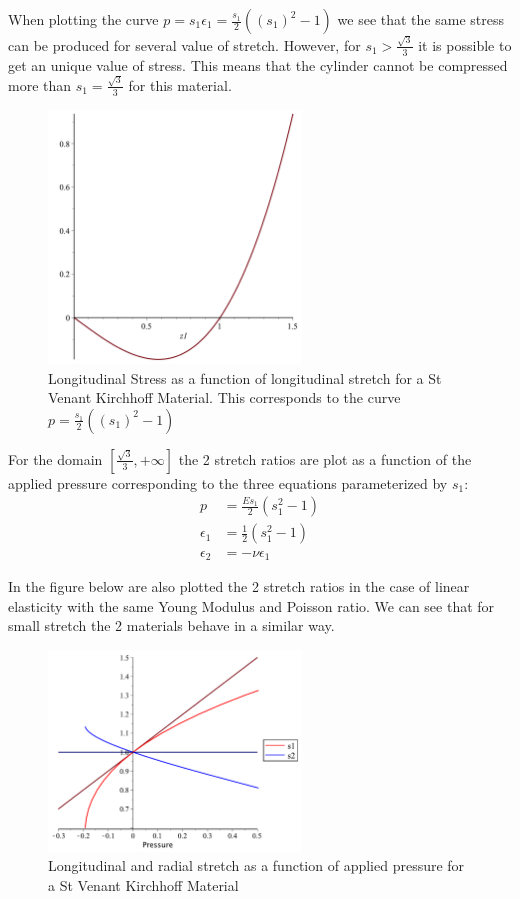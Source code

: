 \documentclass[a4paper,11pt]{article}
\begin{document}
When plotting the curve $p=s_1 \epsilon_1 =\frac{s_1}{2}((s_1)^2-1)$ we see that the same stress can be produced for several value of stretch. However, for $s_1 > \frac{\sqrt{3}}{3}$ it is possible to get an unique value of stress. This means that the cylinder cannot be compressed more than $s_1=\frac{\sqrt{3}}{3}$ for this material.

\begin{figure}[!htbp]
	\centering
    \includegraphics[width=0.60\textwidth]{StressSVK}
	\caption{Longitudinal Stress as a function of longitudinal stretch for a St  Venant Kirchhoff Material. This corresponds to the curve $p=\frac{s_1}{2}((s_1)^2-1)$}
	\label{fig:PureTractionSVKStress}
\end{figure}

For the domain $[\frac{\sqrt{3}}{3},+\infty]$  the 2 stretch ratios are plot as a function of the applied pressure corresponding to the three equations parameterized by $s_1$:
\begin{align*}
p&=\frac{E s_1 }{2}(s_1^2 -1) \\
\epsilon_1&=\frac{1}{2}(s_1^2 -1)\\
\epsilon_2 &= -\nu \epsilon_1
\end{align*}

In the figure below are also plotted the 2 stretch ratios in the case of linear elasticity with the same Young Modulus and Poisson ratio. We can see that for small stretch the 2 materials behave in a similar way. 

\begin{figure}[!htbp]
	\centering
    \includegraphics[width=0.60\textwidth]{CurveSVK}
	\caption{Longitudinal and radial stretch as a function of applied pressure for a St  Venant Kirchhoff Material}
	\label{fig:PureTractionSVK}
\end{figure}
\end{document}
